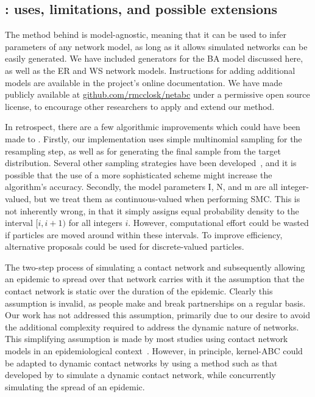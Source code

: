 \subsection{: uses, limitations, and possible extensions}

The method behind  is model-agnostic, meaning that it can be
used to infer parameters of any network model, as long as it allows simulated
networks can be easily generated. We have included generators for the \gls{BA}
model discussed here, as well as the \gls{ER} and \gls{WS} network models.
Instructions for adding additional models are available in the project's online
documentation. We have made  publicly available at
\url{github.com/rmcclosk/netabc} under a permissive open source license, to
encourage other researchers to apply and extend our method.

In retrospect, there are a few algorithmic improvements which could have been
made to . Firstly, our implementation uses simple multinomial
sampling for the resampling step, as well as for generating the final sample
from the target distribution.  Several other sampling strategies have been
developed~\autocite{douc2005comparison}, and it is possible that the use of a
more sophisticated scheme might increase the algorithm's accuracy. Secondly,
the model parameters \gls{I}, \gls{N}, and \gls{m} are all integer-valued, but
we treat them as continuous-valued when performing \gls{SMC}. This is not
inherently wrong, in that it simply assigns equal probability density to the
interval $[i, i+1)$ for all integers $i$. However, computational effort could
be wasted if particles are moved around within these intervals. To improve
efficiency, alternative proposals could be used for discrete-valued particles.


The two-step process of simulating a contact network and subsequently allowing
an epidemic to spread over that network carries with it the assumption that the
contact network is static over the duration of the epidemic. Clearly this
assumption is invalid, as people make and break partnerships on a regular
basis. Our work has not addressed this assumption, primarily due to our desire
to avoid the additional complexity required to address the dynamic nature of
networks. This simplifying assumption is made by most studies using contact
network models in an epidemiological context~\autocite{welch2011statistical,
bansal2007individual}. However, in principle, kernel-\gls{ABC} could be
adapted to dynamic contact networks by using a method such as that developed by
\textcite{robinson2012dynamics} to simulate a dynamic contact network, while
concurrently simulating the spread of an epidemic.

